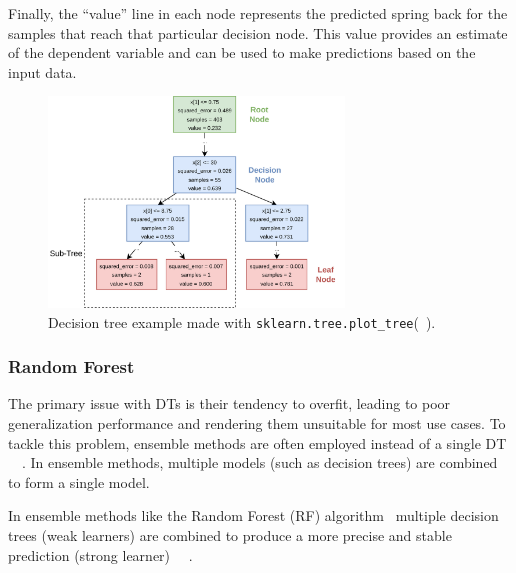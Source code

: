 Finally, the ``value'' line in each node represents the predicted spring back for the samples that reach that
particular decision node.
This value provides an estimate of the dependent variable and can be used to make predictions based on the input data.

\begin{figure}[]
    \begin{tcolorbox}[arc=0pt,boxrule=0.5pt]
        \centering
        \includegraphics[width=0.7\textwidth]{chap4/images/decision_tree_example}
    \end{tcolorbox}
    \caption{Decision tree example made with \texttt{sklearn.tree.plot\_tree}(~\cite{scikit-learn}).
    }
    \label{fig:dt-example}
\end{figure}

\subsubsection{Random Forest}\label{subsubsec:random-forests}
The primary issue with DTs is their tendency to overfit, leading to poor generalization
performance and rendering them unsuitable for most use cases.
To tackle this problem, ensemble methods are often employed instead of a single
DT
~\cite[p. 83]{muller2016introduction}~\cite[p. 251]{liu2012new}.
In ensemble methods, multiple models (such as decision trees) are combined to form a single model.

In ensemble methods like the Random Forest (RF) algorithm~\cite[]{breiman2001random} multiple decision
trees (weak learners) are combined to produce a more precise and stable prediction (strong learner)
~\cite[p. 24]{awad2015efficient}~\cite[pp. 340]{gareth2013introduction}.

